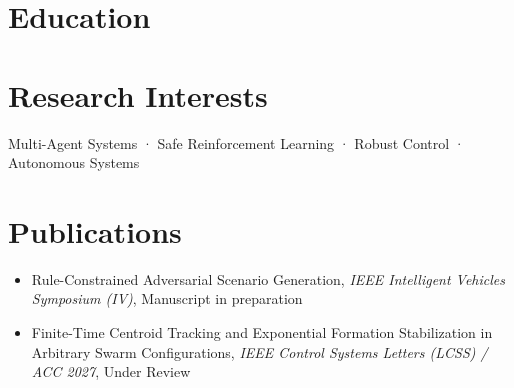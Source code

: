 \documentclass[11pt,a4paper,calibri]{moderncv}        %
\begin{document}
\makecvtitle
\renewcommand\UrlFont{\color{blue}\rmfamily}
\vspace{-0.5 in}
\section{Education}

\begin{itemize}[leftmargin=0.0in]
\setlength\itemsep{.1em}

\vspace{-6 pt}

\end{itemize}
\vspace{-15 pt}

\section{Research Interests}

\hspace{1em} Multi-Agent Systems · Safe Reinforcement Learning · Robust Control · Autonomous Systems
\vspace{-6pt}

\section{Publications}

\begin{itemize}[leftmargin=.2in]
\setlength\itemsep{.2em}

\item Rule-Constrained Adversarial Scenario Generation, \textit{IEEE Intelligent Vehicles Symposium (IV)}, Manuscript in preparation
\vspace{-1 pt}
\item Finite-Time Centroid Tracking and Exponential Formation Stabilization
in Arbitrary Swarm Configurations, \textit{IEEE Control Systems Letters (LCSS) / ACC 2027}, Under Review
\vspace{-1.5 pt}
\end{itemize}
\vspace{-15 pt}
\end{document}
